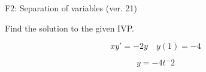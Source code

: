 \begin{exercise}
  \begin{exerciseTitle}F2: Separation of variables (ver. 21)\end{exerciseTitle}
  \begin{exerciseStatement}
    
Find the solution to the given IVP.

    
\[xy'= -2 y \hspace{1em} y( 1 ) = -4\]

  \end{exerciseStatement}
  \begin{exerciseAnswer}
    
\[y= -4 t^ -2\]

  \end{exerciseAnswer}
\end{exercise}